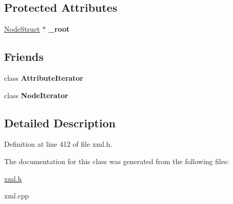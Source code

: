 \subsection*{Protected Attributes}
\begin{DoxyCompactItemize}
\item 
\hypertarget{classphys_1_1xml_1_1Node_ae76db7e7025e29af83e487cf4b270424}{
\hyperlink{structphys_1_1xml_1_1NodeStruct}{NodeStruct} $\ast$ {\bfseries \_\-root}}
\label{d7/d0a/classphys_1_1xml_1_1Node_ae76db7e7025e29af83e487cf4b270424}

\end{DoxyCompactItemize}
\subsection*{Friends}
\begin{DoxyCompactItemize}
\item 
\hypertarget{classphys_1_1xml_1_1Node_a1ed8790083a80b2604beba1c666bce6e}{
class {\bfseries AttributeIterator}}
\label{d7/d0a/classphys_1_1xml_1_1Node_a1ed8790083a80b2604beba1c666bce6e}

\item 
\hypertarget{classphys_1_1xml_1_1Node_ac5a1d2c6036b7ba1894a7c3b8d96a312}{
class {\bfseries NodeIterator}}
\label{d7/d0a/classphys_1_1xml_1_1Node_ac5a1d2c6036b7ba1894a7c3b8d96a312}

\end{DoxyCompactItemize}


\subsection{Detailed Description}


Definition at line 412 of file xml.h.



The documentation for this class was generated from the following files:\begin{DoxyCompactItemize}
\item 
\hyperlink{xml_8h}{xml.h}\item 
xml.cpp\end{DoxyCompactItemize}
